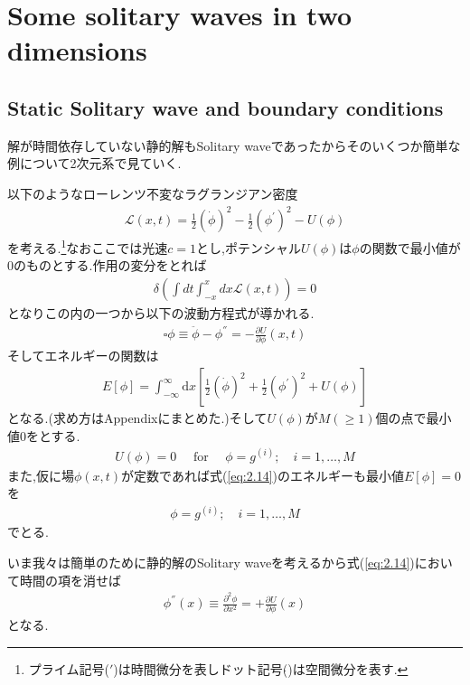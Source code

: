 \documentclass[dvipdfmx,11pt,a4paper,oneside,openany]{jsbook}
\begin{document}
\section{Some solitary waves in two dimensions}
\subsection{Static Solitary wave and boundary conditions}
解が時間依存していない静的解もSolitary waveであったからそのいくつか簡単な例について2次元系で見ていく.

以下のようなローレンツ不変なラグランジアン密度
\begin{align}
    \mathscr{L}(x, t)=\frac{1}{2}(\dot{\phi})^{2}-\frac{1}{2}\left(\phi^{'}\right)^{2}-U(\phi)
\end{align}
を考える.\footnote{プライム記号($'$)は時間微分を表しドット記号($\dot{ }$)は空間微分を表す.}なおここでは光速$c=1$とし,ポテンシャル$U(\phi)$は$\phi$の関数で最小値が0のものとする.作用の変分をとれば
\begin{align}
    \delta\left(\int dt \int_{-x}^{x}dx\mathscr{L}(x,t)\right)=0
\end{align}
となりこの内の一つから以下の波動方程式が導かれる.
\begin{align}
    \square \phi \equiv \ddot{\phi}-\phi^{''}=-\frac{\partial U}{\partial \phi}(x, t)\label{eq:2.13}
\end{align}
そしてエネルギーの関数は
\begin{align}
    E[\phi]=\int_{-\infty}^{\infty} \mathrm{d} x\left[\frac{1}{2}(\dot{\phi})^{2}+\frac{1}{2}\left(\phi^{'}\right)^{2}+U(\phi)\right]\label{eq:2.14}
\end{align}
となる.(求め方はAppendixにまとめた.)そして$U(\phi)$が$M(\geq1)$個の点で最小値0をとする.
\begin{align}
    U(\phi)=0 \quad \text { for } \quad \phi=g^{(i)} ; \quad i=1, \ldots, M\label{eq:2.15}
\end{align}
また,仮に場$\phi(x,t)$が定数であれば式(\ref{eq:2.14})のエネルギーも最小値$E[\phi]=0$を
\begin{align}
    \phi=g^{(i)} ; \quad i=1, \ldots, M
\end{align}
でとる.

いま我々は簡単のために静的解のSolitary waveを考えるから式(\ref{eq:2.14})において時間の項を消せば
\begin{align}
    \phi^{''}(x) \equiv \frac{\partial^{2} \phi}{\partial x^{2}}=+\frac{\partial U}{\partial \phi}(x)\label{eq:2.17}
\end{align}
となる.
\end{document}
